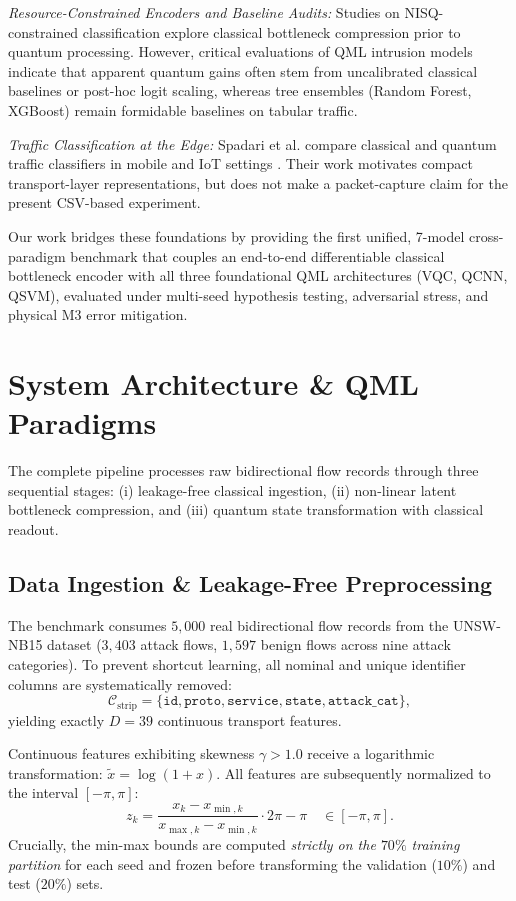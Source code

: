 \documentclass[conference]{IEEEtran}
\begin{document}
\textit{Resource-Constrained Encoders and Baseline Audits:} Studies on NISQ-constrained classification explore classical bottleneck compression prior to quantum processing. However, critical evaluations of QML intrusion models indicate that apparent quantum gains often stem from uncalibrated classical baselines or post-hoc logit scaling, whereas tree ensembles (Random Forest, XGBoost) remain formidable baselines on tabular traffic.

\textit{Traffic Classification at the Edge:} Spadari et al. compare classical and quantum traffic classifiers in mobile and IoT settings \cite{spadari2024edge,spadari2025reality}. Their work motivates compact transport-layer representations, but does not make a packet-capture claim for the present CSV-based experiment.

Our work bridges these foundations by providing the first unified, 7-model cross-paradigm benchmark that couples an end-to-end differentiable classical bottleneck encoder with all three foundational QML architectures (VQC, QCNN, QSVM), evaluated under multi-seed hypothesis testing, adversarial stress, and physical M3 error mitigation.

\section{System Architecture \& QML Paradigms}
The complete pipeline processes raw bidirectional flow records through three sequential stages: (i) leakage-free classical ingestion, (ii) non-linear latent bottleneck compression, and (iii) quantum state transformation with classical readout.

\subsection{Data Ingestion \& Leakage-Free Preprocessing}
The benchmark consumes $5{,}000$ real bidirectional flow records from the UNSW-NB15 dataset ($3{,}403$ attack flows, $1{,}597$ benign flows across nine attack categories). To prevent shortcut learning, all nominal and unique identifier columns are systematically removed:
\begin{equation}
\mathcal{C}_{\text{strip}} = \{\texttt{id}, \texttt{proto}, \texttt{service}, \texttt{state}, \texttt{attack\_cat}\},
\end{equation}
yielding exactly $D=39$ continuous transport features.

Continuous features exhibiting skewness $\gamma > 1.0$ receive a logarithmic transformation: $\tilde{x} = \log(1 + x)$. All features are subsequently normalized to the interval $[-\pi, \pi]$:
\begin{equation}
z_k = \frac{x_k - x_{\min, k}}{x_{\max, k} - x_{\min, k}} \cdot 2\pi - \pi \quad \in [-\pi, \pi].
\end{equation}
Crucially, the min-max bounds are computed \textit{strictly on the $70\%$ training partition} for each seed and frozen before transforming the validation ($10\%$) and test ($20\%$) sets.
\end{document}
